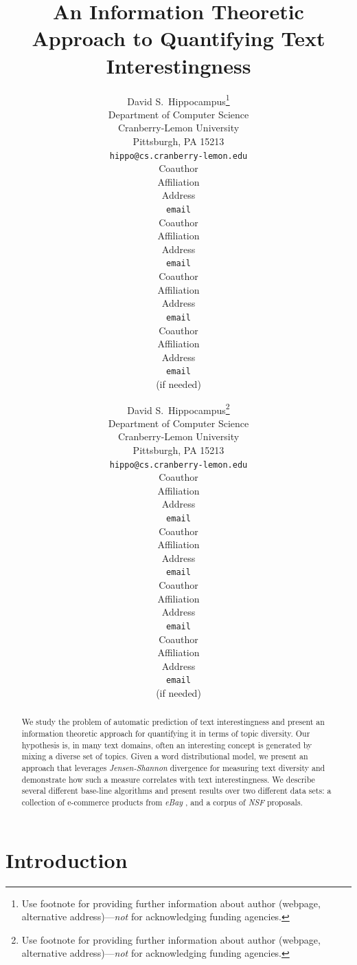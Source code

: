 \documentclass{article} %
\title{An Information Theoretic Approach to Quantifying Text Interestingness}
\author{
David S.~Hippocampus\thanks{ Use footnote for providing further information
about author (webpage, alternative address)---\emph{not} for acknowledging
funding agencies.} \\
Department of Computer Science\\
Cranberry-Lemon University\\
Pittsburgh, PA 15213 \\
\texttt{hippo@cs.cranberry-lemon.edu} \\
\And
Coauthor \\
Affiliation \\
Address \\
\texttt{email} \\
\AND
Coauthor \\
Affiliation \\
Address \\
\texttt{email} \\
\And
Coauthor \\
Affiliation \\
Address \\
\texttt{email} \\
\And
Coauthor \\
Affiliation \\
Address \\
\texttt{email} \\
(if needed)\\
}
\author{
David S.~Hippocampus\thanks{ Use footnote for providing further information
about author (webpage, alternative address)---\emph{not} for acknowledging
funding agencies.} \\
Department of Computer Science\\
Cranberry-Lemon University\\
Pittsburgh, PA 15213 \\
\texttt{hippo@cs.cranberry-lemon.edu} \\
\And
Coauthor \\
Affiliation \\
Address \\
\texttt{email} \\
\AND
Coauthor \\
Affiliation \\
Address \\
\texttt{email} \\
\And
Coauthor \\
Affiliation \\
Address \\
\texttt{email} \\
\And
Coauthor \\
Affiliation \\
Address \\
\texttt{email} \\
(if needed)\\
}
\begin{document}
\maketitle

\begin{abstract}

We study the problem of automatic prediction of text interestingness and present an information theoretic approach for
quantifying it in terms of topic diversity. Our hypothesis is, in many text domains, often an interesting
concept is generated by mixing a diverse set of topics. Given a word distributional model, we present
an approach that leverages {\sl Jensen-Shannon} divergence for measuring text diversity and demonstrate how such a measure
correlates with text interestingness. We describe several different base-line algorithms and present results over two different
data sets: a collection of e-commerce products from {\sl eBay} , and a corpus of {\sl NSF} proposals.
\end{abstract}



\section{Introduction}
\label{sec:introduction}
\end{document}
